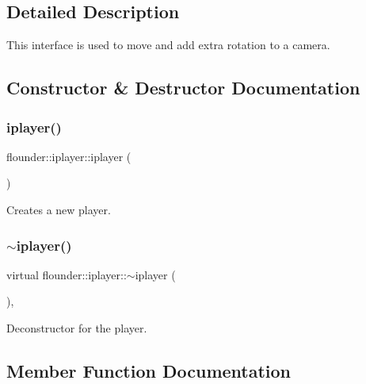 \subsection{Detailed Description}
This interface is used to move and add extra rotation to a camera. 



\subsection{Constructor \& Destructor Documentation}
\mbox{\label{classflounder_1_1iplayer_a5059d646c0397251c493c19c9a64f15a}} 
\subsubsection{\texorpdfstring{iplayer()}{iplayer()}}
{\footnotesize\ttfamily flounder\+::iplayer\+::iplayer (\begin{DoxyParamCaption}{ }\end{DoxyParamCaption})\hspace{0.3cm}{\ttfamily [inline]}}



Creates a new player. 

\mbox{\label{classflounder_1_1iplayer_af9dfb4e8585b475cc3178284e6815be1}} 
\subsubsection{\texorpdfstring{$\sim$iplayer()}{~iplayer()}}
{\footnotesize\ttfamily virtual flounder\+::iplayer\+::$\sim$iplayer (\begin{DoxyParamCaption}{ }\end{DoxyParamCaption})\hspace{0.3cm}{\ttfamily [inline]}, {\ttfamily [virtual]}}



Deconstructor for the player. 



\subsection{Member Function Documentation}
\mbox{\label{classflounder_1_1iplayer_a4e1ed034ef9590feccaaeec519cdf43b}} 
